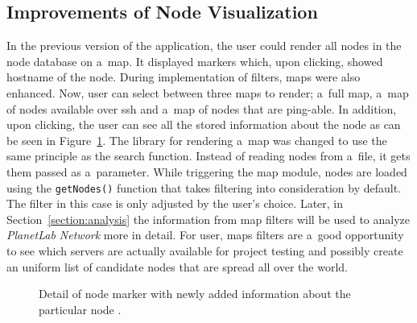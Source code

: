 {{{{{{\subsection{Improvements of Node Visualization}
In the previous version of the application, the user could render all nodes in the node database on a~map. It displayed markers which, upon clicking, showed hostname of the node. During implementation of filters, maps were also enhanced. Now, user can select between three maps to render; a~full map, a~map of nodes available over ssh and a~map of nodes that are ping-able. In addition, upon clicking, the user can see all the stored information about the node as can be seen in Figure~\ref{fig:mapnodedetail}. The library for rendering a~map was changed to use the same principle as the search function. Instead of reading nodes from a~file, it gets them passed as a~parameter. While triggering the map module, nodes are loaded using the \texttt{getNodes()} function that takes filtering into consideration by default. The filter in this case is only adjusted by the user's choice. Later, in Section~\ref{section:analysis} the information from map filters will be used to analyze \textit{PlanetLab Network} more in detail. For user, maps filters are a~good opportunity to see which servers are actually available for project testing and possibly create an uniform list of candidate nodes that are spread all over the world. 

\begin{figure}[H]
	\centering
	\caption{Detail of node marker with newly added information about the particular node \cite{OpenStreetMap}.}
	\label{fig:mapnodedetail}
\end{figure}

}}}}}}

